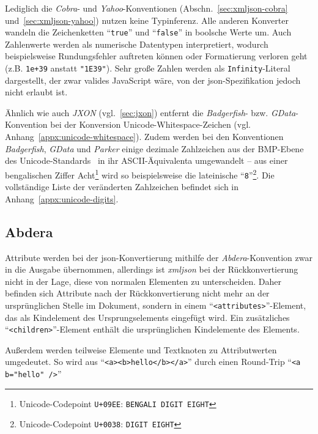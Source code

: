 Lediglich die \emph{Cobra}- und \emph{Yahoo}-Konventionen (Abschn.~\ref{sec:xmljson-cobra} und~\ref{sec:xmljson-yahoo}) nutzen keine Typinferenz. Alle anderen Konverter wandeln die Zeichenketten \enquote{\texttt{true}} und \enquote{\texttt{false}} in boolsche Werte um. Auch Zahlenwerte werden als numerische Datentypen interpretiert, wodurch beispielsweise Rundungsfehler auftreten können oder Formatierung verloren geht (z.B. \texttt{1e+39} anstatt \texttt{"1E39"}). Sehr große Zahlen werden als \texttt{Infinity}-Literal dargestellt, der zwar valides JavaScript wäre, von der \acrshort{json}-Spezifikation jedoch nicht erlaubt ist.

Ähnlich wie auch \emph{JXON} (vgl.~\ref{sec:jxon}) entfernt die \emph{Badgerfish}- bzw. \emph{GData}-Konvention bei der Konversion Unicode-Whitespace-Zeichen (vgl. Anhang~\ref{appx:unicode-whitespace}). Zudem werden bei den Konventionen \emph{Badgerfish}, \emph{GData} und \emph{Parker} einige dezimale Zahlzeichen aus der BMP-Ebene des Unicode-Standards~\cite[S.~49]{unicode9} in ihr ASCII-Äquivalenta umgewandelt -- aus einer bengalischen Ziffer Acht\footnote{Unicode-Codepoint \texttt{U+09EE}: \texttt{BENGALI DIGIT EIGHT}} wird so beispielsweise die lateinische \enquote{\texttt{8}}\footnote{Unicode-Codepoint \texttt{U+0038}: \texttt{DIGIT EIGHT}}. Die vollständige Liste der veränderten Zahlzeichen befindet sich in Anhang~\ref{appx:unicode-digits}.

\subsection{Abdera}
\label{sec:xmljson-abdera}

Attribute werden bei der \acrshort{json}-Konvertierung mithilfe der \emph{Abdera}-Konvention zwar in die Ausgabe übernommen, allerdings ist \emph{xmljson} bei der Rückkonvertierung nicht in der Lage, diese von normalen Elementen zu unterscheiden. Daher befinden sich Attribute nach der Rückkonvertierung nicht mehr an der ursprünglichen Stelle im Dokument, sondern in einem \enquote{\texttt{<attributes>}}-Element, das als Kindelement des Ursprungselements eingefügt wird. Ein zusätzliches \enquote{\texttt{<children>}}-Element enthält die ursprünglichen Kindelemente des Elements.

Außerdem werden teilweise Elemente und Textknoten zu Attributwerten umgedeutet. So wird aus \enquote{\texttt{<a><b>hello</b></a>}} durch einen Round-Trip \enquote{\texttt{<a b="hello" />}}

